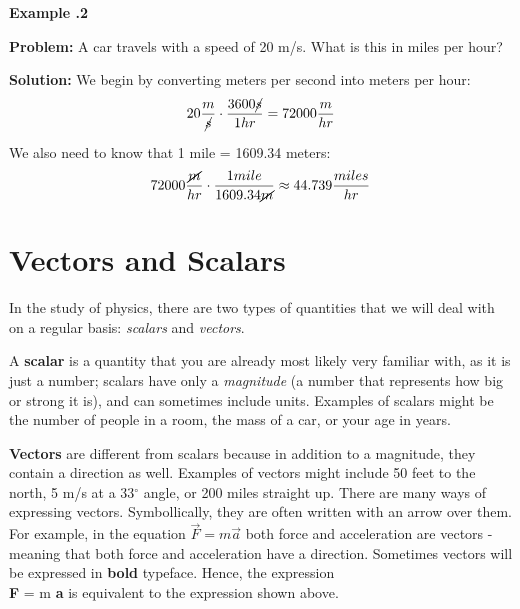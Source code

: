 	
\begin{mdframed}[backgroundcolor=blue!10!white]
	\begin{center}
		\textbf{Example \thesubsection.2}	\label{ex1132}
	\end{center}
	
	\vspace{0.1in}	
	\textbf{Problem:} A car travels with a speed of 20 m/s.  What is this in miles per hour? 
	\vspace{0.1in}
	
	\textbf{Solution:} We begin by converting meters per second into meters per hour:
	\begin{equation*}
	20 \frac{m}{\cancel{s}} \cdot \frac{3600 \cancel{s}}{1 {hr}} = 72000 \frac{m}{hr}
	\end{equation*}
	
	We also need to know that 1 mile = 1609.34 meters:
	\begin{equation*}
		72000 \frac{\cancel{m}}{hr} \cdot \frac{1 mile}{1609.34 \cancel{m}} \approx 44.739 \frac{miles}{hr} 
	\end{equation*}
	
	
\end{mdframed}
		


\section{Vectors and Scalars}
In the study of physics, there are two types of quantities that we will deal with on a regular basis: \textit{scalars} and \textit{vectors}.  

A \textbf{scalar} is a quantity that you are already most likely very familiar with, as it is just a number; scalars have only a \textit{magnitude} (a number that represents how big or strong it is), and can sometimes include units.  Examples of scalars might be the number of people in a room, the mass of a car, or your age in years.  

\textbf{Vectors} are different from scalars because in addition to a magnitude, they contain a direction as well.  Examples of vectors might include 50 feet to the north, 5 m/s at a 33$^\circ$ angle, or 200 miles straight up.  
There are many ways of expressing vectors.  Symbollically, they are often written with an arrow over them.  For example, in the equation \color{blue} $\vec{F} = m \vec{a}$ \color{black}  both force and acceleration are vectors - meaning that both force and acceleration have a direction.  Sometimes vectors will be expressed in \textbf{bold} typeface.   Hence, the expression \\ \color{blue} \textbf{F} = m \textbf{a}  \color{black} is equivalent to the expression shown above.

